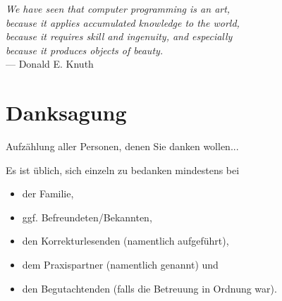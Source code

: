 \cleardoublepage
{}
\begin{flushright}{\slshape
    We have seen that computer programming is an art, \\
    because it applies accumulated knowledge to the world, \\
    because it requires skill and ingenuity, and especially \\
    because it produces objects of beauty.} \\ \medskip
    --- {Donald E. Knuth}\cite{knuth:1974}
\end{flushright}

\bigskip

\begingroup
\let\clearpage\relax
\let\cleardoublepage\relax
\let\cleardoublepage\relax
\chapter*{Danksagung}
Aufzählung aller Personen, denen Sie danken wollen...


\noindent Es ist üblich, sich einzeln zu bedanken mindestens bei
\begin{itemize}
    \item der Familie,
    \item ggf. Befreundeten/Bekannten,
    \item den Korrekturlesenden (namentlich aufgeführt),
    \item dem Praxispartner (namentlich genannt) und
    \item den Begutachtenden (falls die Betreuung in Ordnung war).
\end{itemize}
\endgroup